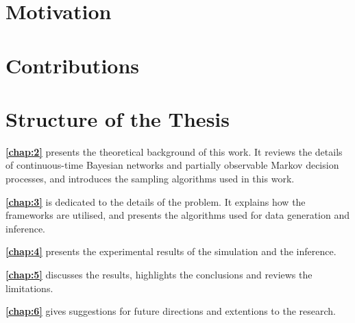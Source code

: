 \section{Motivation}



\section{Contributions}



\section{Structure of the Thesis}
\textbf{\cref{chap:2}} presents the theoretical background of this work. It reviews the details of continuous-time Bayesian networks and partially observable Markov decision processes, and introduces the sampling algorithms used in this work.

\textbf{\cref{chap:3}} is dedicated to the details of the problem. It explains how the frameworks are utilised, and presents the algorithms used for data generation and inference.

\textbf{\cref{chap:4}} presents the experimental results of the simulation and the inference.

\textbf{\cref{chap:5}} discusses the results, highlights the conclusions and reviews the limitations.

\textbf{\cref{chap:6}} gives suggestions for future directions and extentions to the research.